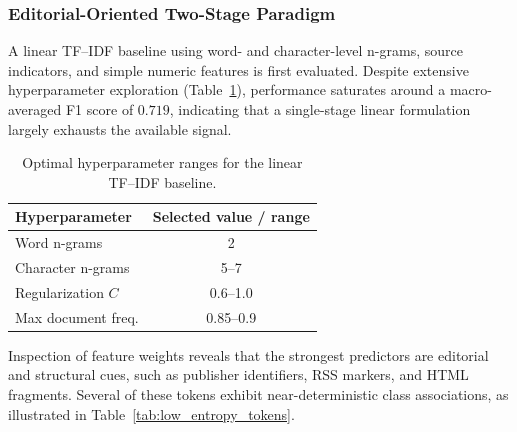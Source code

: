 \subsubsection{Editorial-Oriented Two-Stage Paradigm}

A linear TF--IDF baseline using word- and character-level n-grams, source
indicators, and simple numeric features is first evaluated. Despite extensive
hyperparameter exploration (Table~\ref{tab:baseline_hyperparams}), performance
saturates around a macro-averaged F1 score of $0.719$, indicating that a
single-stage linear formulation largely exhausts the available signal.

\begin{table}[H]
\centering
\caption{Optimal hyperparameter ranges for the linear TF--IDF baseline.}
\label{tab:baseline_hyperparams}
\begin{tabular}{lc}
\hline
\textbf{Hyperparameter} & \textbf{Selected value / range} \\
\hline
Word n-grams        & 2 \\
Character n-grams   & 5--7 \\
Regularization $C$  & 0.6--1.0 \\
Max document freq.  & 0.85--0.9 \\
\hline
\end{tabular}
\end{table}

Inspection of feature weights reveals that the strongest predictors are
editorial and structural cues, such as publisher identifiers, RSS markers,
and HTML fragments. Several of these tokens exhibit near-deterministic class
associations, as illustrated in Table~\ref{tab:low_entropy_tokens}.

\begin{table}[H]
\centering
\caption{Examples of high-support editorial tokens with near-zero conditional entropy.}
\label{tab:low_entropy_tokens}
\small
{}
\end{table}

